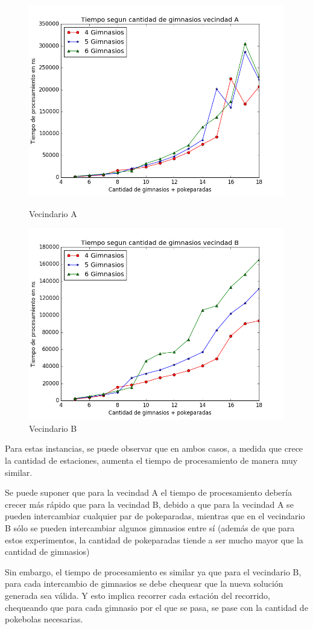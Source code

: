\begin{figure}[H]
  \includegraphics[width=\linewidth]{imagenes/Ej3/Exp1Ej3a.png}
  \caption{Vecindario A}
\endminipage\hfill
{}%
  \includegraphics[width=\linewidth]{imagenes/Ej3/Exp1Ej3b.png}
  \caption{Vecindario B}
\endminipage
\end{figure}

\blindtext

Para estas instancias, se puede observar que en ambos casos, a medida que crece la cantidad de estaciones, aumenta el tiempo de procesamiento de manera muy similar.
\par Se puede suponer que para la vecindad A el tiempo de procesamiento debería crecer más rápido que para la vecindad B, debido a que para la vecindad A se pueden intercambiar cualquier par de pokeparadas, mientras que en el vecindario B sólo se pueden intercambiar algunos gimnasios entre sí (además de que para estos experimentos, la cantidad de pokeparadas tiende a ser mucho mayor que la cantidad de gimnasios)
\par Sin embargo, el tiempo de procesamiento es similar ya que para el vecindario B, para cada intercambio de gimnasios se debe chequear que la nueva solución generada sea válida. Y esto implica recorrer cada estación del recorrido, chequeando que para cada gimnasio por el que se pasa, se pase con la cantidad de pokebolas necesarias.
